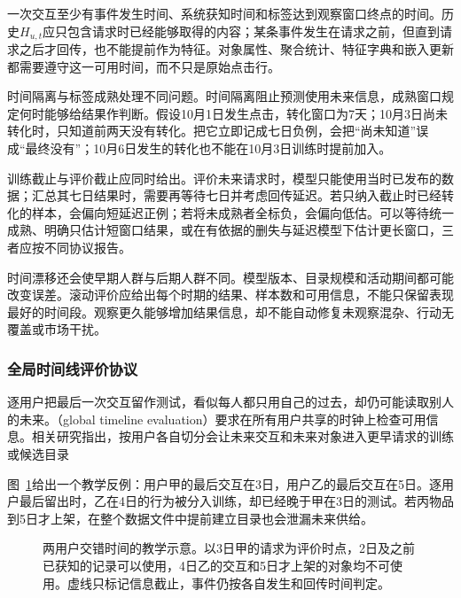 一次交互至少有事件发生时间、系统获知时间和标签达到观察窗口终点的时间。历史$H_{u,t}$应只包含请求时已经能够取得的内容；某条事件发生在请求之前，但直到请求之后才回传，也不能提前作为特征。对象属性、聚合统计、特征字典和嵌入更新都需要遵守这一可用时间，而不只是原始点击行。

时间隔离与标签成熟处理不同问题。时间隔离阻止预测使用未来信息，成熟窗口规定何时能够给结果作判断。假设10月1日发生点击，转化窗口为7天；10月3日尚未转化时，只知道前两天没有转化。把它立即记成七日负例，会把“尚未知道”误成“最终没有”；10月6日发生的转化也不能在10月3日训练时提前加入。

训练截止与评价截止应同时给出。评价未来请求时，模型只能使用当时已发布的数据；汇总其七日结果时，需要再等待七日并考虑回传延迟。若只纳入截止时已经转化的样本，会偏向短延迟正例；若将未成熟者全标负，会偏向低估。可以等待统一成熟、明确只估计短窗口结果，或在有依据的删失与延迟模型下估计更长窗口，三者应按不同协议报告。

时间漂移还会使早期人群与后期人群不同。模型版本、目录规模和活动期间都可能改变误差。滚动评价应给出每个时期的结果、样本数和可用信息，不能只保留表现最好的时间段。观察更久能够增加结果信息，却不能自动修复未观察混杂、行动无覆盖或市场干扰。

\Needspace{95mm}
\subsubsection{全局时间线评价协议}
\label{sec:rs-evaluation-timeline}

逐用户把最后一次交互留作测试，看似每人都只用自己的过去，却仍可能读取别人的未来。（global timeline evaluation）要求在所有用户共享的时钟上检查可用信息。相关研究指出，按用户各自切分会让未来交互和未来对象进入更早请求的训练或候选目录

图~\ref{fig:rs-evaluation-timeline}给出一个教学反例：用户甲的最后交互在3日，用户乙的最后交互在5日。逐用户最后留出时，乙在4日的行为被分入训练，却已经晚于甲在3日的测试。若丙物品到5日才上架，在整个数据文件中提前建立目录也会泄漏未来供给。

\begin{figure}[htbp]
  \centering
  
  \caption{两用户交错时间的教学示意。以3日甲的请求为评价时点，2日及之前已获知的记录可以使用，4日乙的交互和5日才上架的对象均不可使用。虚线只标记信息截止，事件仍按各自发生和回传时间判定。}
  \label{fig:rs-evaluation-timeline}
\end{figure}

